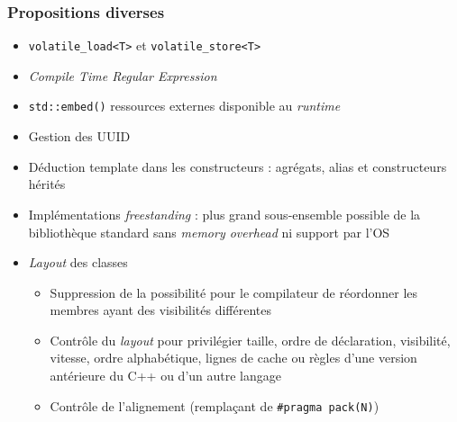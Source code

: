 \documentclass[C++.tex]{subfiles}
\begin{document}
\begin{frame}[fragile]
	\frametitle{Propositions diverses}
	\begin{itemize}
		\item \lstinline|volatile_load<T>| et \lstinline|volatile_store<T>|
		\item \textit{Compile Time Regular Expression}
		\item \lstinline|std::embed()| ressources externes disponible au \textit{runtime} 


		\item Gestion des UUID
		\item Déduction template dans les constructeurs : agrégats, alias et constructeurs hérités


		\item Implémentations \textit{freestanding} : plus grand sous-ensemble possible de la bibliothèque standard sans \textit{memory overhead} ni support par l'OS


		\item \textit{Layout} des classes
		\begin{itemize}
			\item Suppression de la possibilité pour le compilateur de réordonner les membres ayant des visibilités différentes


			\item Contrôle du \textit{layout} pour privilégier taille, ordre de déclaration, visibilité, vitesse, ordre alphabétique, lignes de cache ou règles d'une version antérieure du C++ ou d'un autre langage
			\item Contrôle de l'alignement (remplaçant de \lstinline|#pragma pack(N)|)
		\end{itemize}

	\end{itemize}
\end{frame}
\end{document}

